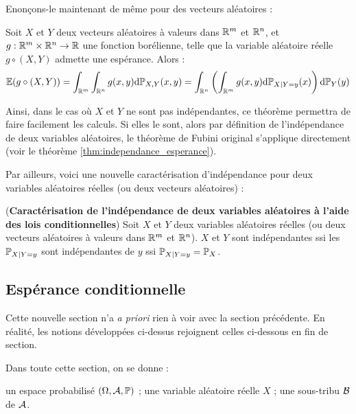 \documentclass[../integ-proba.tex]{subfiles}
\begin{document}
    Enonçons-le maintenant de même pour des vecteurs aléatoires :

    \begin{thm}
        Soit $X$ et $Y$ deux vecteurs aléatoires à valeurs dans $\mathbb{R}^m$ et $\mathbb{R}^n$, et $g : \mathbb{R}^m \times \mathbb{R}^n \rightarrow \mathbb{R}$ une fonction borélienne, telle que la variable aléatoire réelle $g \circ (X,Y)$ admette une espérance.
        Alors :
        \begin{displaymath}
            \mathbb{E}(g \circ (X,Y)) = \int_{\mathbb{R}^m} \int_{\mathbb{R}^n} g(x,y) \textnormal{d} \mathbb{P}_{X,Y} (x,y) = \int_{\mathbb{R}^n} \left( \int_{\mathbb{R}^m} g(x,y) \textnormal{d}\mathbb{P}_{X | Y=y} (x) \right) \textnormal{d} \mathbb{P}_Y (y)
        \end{displaymath}
    \end{thm}

    \begin{rem}
        Ainsi, dans le cas où $X$ et $Y$ ne sont pas indépendantes, ce théorème permettra de faire facilement les calculs.
        Si elles le sont, alors par définition de l'indépendance de deux variables aléatoires, le théorème de Fubini \og original \fg{} s'applique directement (voir le théorème \ref{thm:independance_esperance}).
    \end{rem}

    Par ailleurs, voici une nouvelle caractérisation d'indépendance pour deux variables aléatoires réelles (ou deux vecteurs aléatoires) :

    \begin{thm}(\textbf{Caractérisation de l'indépendance de deux variables aléatoires à l'aide des lois conditionnelles})
        Soit $X$ et $Y$ deux variables aléatoires réelles (ou deux vecteurs aléatoires à valeurs dans $\mathbb{R}^m$ et $\mathbb{R}^n$).
        $X$ et $Y$ sont indépendantes ssi les $\mathbb{P}_{X | Y = y}$ sont indépendantes de $y$ ssi $\mathbb{P}_{X | Y = y} = \mathbb{P}_X$.
    \end{thm}

    \subsection{Espérance conditionnelle}

    Cette nouvelle section n'a \textit{a priori} rien à voir avec la section précédente.
    En réalité, les notions développées ci-dessus rejoignent celles ci-dessous en fin de section.

    Dans toute cette section, on se donne :
    \begin{itemize}
        \itemb un espace probabilisé $\left( \Omega, \mathcal{A}, \mathbb{P} \right)$ ;
        \itemb une variable aléatoire réelle $X$ ;
        \itemb une sous-tribu $\mathcal{B}$ de $\mathcal{A}$.
    \end{itemize}
\end{document}
